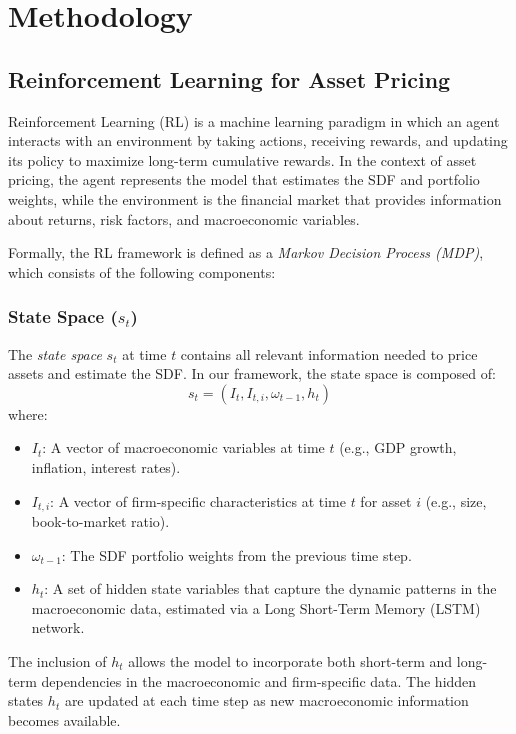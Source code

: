 \section{Methodology}

\subsection{Reinforcement Learning for Asset Pricing}

Reinforcement Learning (RL) is a machine learning paradigm in which an agent interacts with an environment by taking actions, receiving rewards, and updating its policy to maximize long-term cumulative rewards. In the context of asset pricing, the agent represents the model that estimates the SDF and portfolio weights, while the environment is the financial market that provides information about returns, risk factors, and macroeconomic variables.

Formally, the RL framework is defined as a \textit{Markov Decision Process (MDP)}, which consists of the following components:

\subsubsection{State Space ($s_t$)}

The \textit{state space} $s_t$ at time $t$ contains all relevant information needed to price assets and estimate the SDF. In our framework, the state space is composed of:
\[
s_t = \left(I_t, I_{t, i}, \omega_{t-1}, h_t\right)
\]
where:
\begin{itemize}
    \item $I_t$: A vector of macroeconomic variables at time $t$ (e.g., GDP growth, inflation, interest rates).
    \item $I_{t, i}$: A vector of firm-specific characteristics at time $t$ for asset $i$ (e.g., size, book-to-market ratio).
    \item $\omega_{t-1}$: The SDF portfolio weights from the previous time step.
    \item $h_t$: A set of hidden state variables that capture the dynamic patterns in the macroeconomic data, estimated via a Long Short-Term Memory (LSTM) network.
\end{itemize}

The inclusion of $h_t$ allows the model to incorporate both short-term and long-term dependencies in the macroeconomic and firm-specific data. The hidden states $h_t$ are updated at each time step as new macroeconomic information becomes available.

